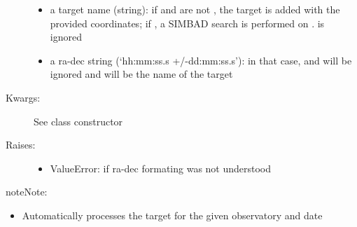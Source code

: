 \documentclass[letterpaper,10pt,english]{sphinxmanual}
\begin{document}
\begin{fulllineitems}
\begin{fulllineitems}
\begin{description}
\begin{itemize}
\item {} 
a target name (string): if  and  are not , the target is added with the provided coordinates; if , a SIMBAD search is performed on .  is ignored

\item {} 
a ra-dec string (`hh:mm:ss.s +/-dd:mm:ss.s'): in that case,  and  will be ignored and  will be the name of the target

\end{itemize}

\item[{Kwargs:}] \leavevmode
See class constructor

\item[{Raises:}] \leavevmode\begin{itemize}
\item {} 
ValueError: if ra-dec formating was not understood

\end{itemize}

\end{description}

\begin{notice}{note}{Note:}\begin{itemize}
\item {} 
Automatically processes the target for the given observatory and date

\end{itemize}
\end{notice}


\end{fulllineitems}
\end{fulllineitems}
\end{document}
